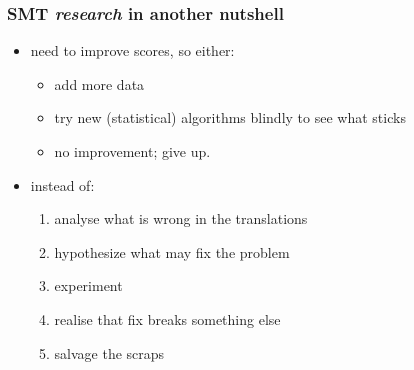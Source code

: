 \documentclass{beamer}
\begin{document}
\begin{frame}
    \frametitle{SMT \emph{research} in another nutshell}
    \begin{itemize}
        \item need to improve scores, so either:
            \begin{itemize}
                \item add more data
                \item try new (statistical) algorithms blindly to see what sticks
                \item no improvement; give up.
            \end{itemize}
        \item instead of:
            \begin{enumerate}
                \item analyse what is wrong in the translations
                \item hypothesize what may fix the problem
                \item experiment
                \item realise that fix breaks something else
                \item salvage the scraps
            \end{enumerate}
    \end{itemize}
\end{frame}
\end{document}
